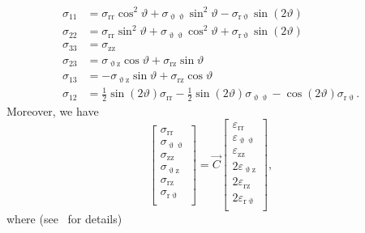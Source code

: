 \begin{align*}
	\sigma_{11} &= \sigma_{\mathrm{rr}}\cos^2\vartheta + \sigma_{\upvartheta\upvartheta}\sin^2\vartheta - \sigma_{\mathrm{r}\upvartheta}\sin(2\vartheta)\\
	\sigma_{22} &= \sigma_{\mathrm{rr}}\sin^2\vartheta + \sigma_{\upvartheta\upvartheta}\cos^2\vartheta + \sigma_{\mathrm{r}\upvartheta}\sin(2\vartheta)\\
	\sigma_{33} &= \sigma_{\mathrm{zz}}\\
	\sigma_{23} &= \sigma_{\upvartheta\mathrm{z}}\cos\vartheta + \sigma_{\mathrm{rz}}\sin\vartheta\\
	\sigma_{13} &= -\sigma_{\upvartheta\mathrm{z}}\sin\vartheta + \sigma_{\mathrm{rz}}\cos\vartheta\\
	\sigma_{12} &= \frac{1}{2}\sin(2\vartheta)\sigma_{\mathrm{rr}} - \frac{1}{2}\sin(2\vartheta)\sigma_{\upvartheta\upvartheta} - \cos(2\vartheta)\sigma_{\mathrm{r}\upvartheta}.
\end{align*}
Moreover, we have
\begin{equation}\label{Eq2:constitutiveRelationPolar}
	\begin{bmatrix}
		\sigma_{\mathrm{rr}}\\
		\sigma_{\upvartheta\upvartheta}\\
		\sigma_{\mathrm{zz}}\\
		\sigma_{\upvartheta\mathrm{z}}\\
		\sigma_{\mathrm{rz}}\\
		\sigma_{\mathrm{r}\upvartheta}\\
	\end{bmatrix} = \vec{C}
	\begin{bmatrix}
		\varepsilon_{\mathrm{rr}}\\
		\varepsilon_{\upvartheta\upvartheta}\\
		\varepsilon_{\mathrm{zz}}\\
		2\varepsilon_{\upvartheta\mathrm{z}}\\
		2\varepsilon_{\mathrm{rz}}\\
		2\varepsilon_{\mathrm{r}\upvartheta}\\
	\end{bmatrix},
\end{equation}
where (see~\cite{Slaughter2002tlt} for details)
